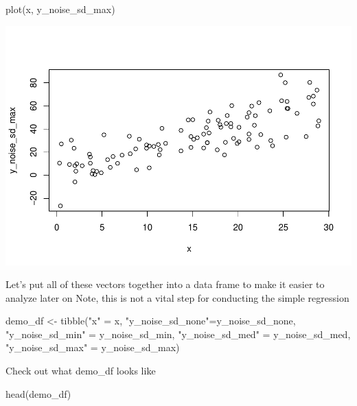 \documentclass[
]{book}
\newenvironment{Shaded}{\begin{snugshade}}{\end{snugshade}}
\newcommand{\FunctionTok}[1]{\textcolor[rgb]{0.00,0.00,0.00}{#1}}
\newcommand{\NormalTok}[1]{#1}
\newcommand{\OtherTok}[1]{\textcolor[rgb]{0.56,0.35,0.01}{#1}}
\newcommand{\StringTok}[1]{\textcolor[rgb]{0.31,0.60,0.02}{#1}}
\begin{document}
\begin{Shaded}
\begin{Highlighting}[]
\FunctionTok{plot}\NormalTok{(x, y\_noise\_sd\_max)}
\end{Highlighting}
\end{Shaded}

\includegraphics{test_course_notes_files/figure-latex/remedy006-4.pdf}

Let's put all of these vectors together into a data frame to make it easier to analyze later on
Note, this is not a vital step for conducting the simple regression

\begin{Shaded}
\begin{Highlighting}[]
\NormalTok{demo\_df }\OtherTok{\textless{}{-}} \FunctionTok{tibble}\NormalTok{(}\StringTok{"x"} \OtherTok{=}\NormalTok{ x, }
                  \StringTok{"y\_noise\_sd\_none"}\OtherTok{=}\NormalTok{y\_noise\_sd\_none, }
                  \StringTok{"y\_noise\_sd\_min"} \OtherTok{=}\NormalTok{ y\_noise\_sd\_min,}
                  \StringTok{"y\_noise\_sd\_med"} \OtherTok{=}\NormalTok{ y\_noise\_sd\_med,}
                  \StringTok{"y\_noise\_sd\_max"} \OtherTok{=}\NormalTok{ y\_noise\_sd\_max)}
\end{Highlighting}
\end{Shaded}

Check out what demo\_df looks like

\begin{Shaded}
\begin{Highlighting}[]
\FunctionTok{head}\NormalTok{(demo\_df)}
\end{Highlighting}
\end{Shaded}
\end{document}
